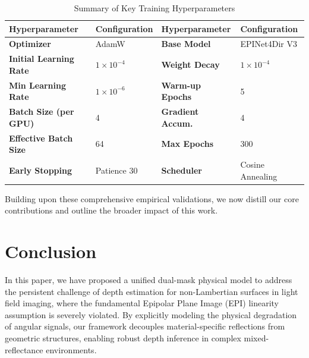 \documentclass[lettersize,journal]{IEEEtran}
\begin{document}
\begin{table}[!t]
\caption{Summary of Key Training Hyperparameters}
\label{tab:hyperparameters}
\centering
\begin{tabular}{llll}
\toprule
\textbf{Hyperparameter} & \textbf{Configuration} & \textbf{Hyperparameter} & \textbf{Configuration} \\
\midrule
\textbf{Optimizer} & AdamW & \textbf{Base Model} & EPINet4Dir V3 \\
\textbf{Initial Learning Rate} & $1 \times 10^{-4}$ & \textbf{Weight Decay} & $1 \times 10^{-4}$ \\
\textbf{Min Learning Rate} & $1 \times 10^{-6}$ & \textbf{Warm-up Epochs} & 5 \\
\textbf{Batch Size (per GPU)} & 4 & \textbf{Gradient Accum.} & 4 \\
\textbf{Effective Batch Size} & 64 & \textbf{Max Epochs} & 300 \\
\textbf{Early Stopping} & Patience 30 & \textbf{Scheduler} & Cosine Annealing \\
\bottomrule
\end{tabular}
\end{table}

Building upon these comprehensive empirical validations, we now distill our core contributions and outline the broader impact of this work.

\section{Conclusion}

In this paper, we have proposed a unified dual-mask physical model to address the persistent challenge of depth estimation for non-Lambertian surfaces in light field imaging, where the fundamental Epipolar Plane Image (EPI) linearity assumption is severely violated. By explicitly modeling the physical degradation of angular signals, our framework decouples material-specific reflections from geometric structures, enabling robust depth inference in complex mixed-reflectance environments. 
\end{document}
